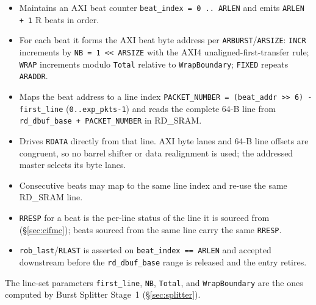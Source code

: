 \begin{itemize}[noitemsep]
  \item Maintains an AXI beat counter \texttt{beat\_index = 0 .. ARLEN} and
        emits \texttt{ARLEN + 1} R beats in order.
  \item For each beat it forms the AXI beat byte address per
        \texttt{ARBURST}/\texttt{ARSIZE}: \texttt{INCR} increments by
        \texttt{NB = 1 << ARSIZE} with the AXI4 unaligned-first-transfer
        rule; \texttt{WRAP} increments modulo \texttt{Total} relative to
        \texttt{WrapBoundary}; \texttt{FIXED} repeats \texttt{ARADDR}.
  \item Maps the beat address to a line index
        \texttt{PACKET\_NUMBER = (beat\_addr >> 6) - first\_line}
        (\texttt{0..exp\_pkts-1}) and reads the complete 64-B line from
        \texttt{rd\_dbuf\_base + PACKET\_NUMBER} in RD\_SRAM.
  \item Drives \texttt{RDATA} directly from that line.  AXI byte lanes and
        64-B line offsets are congruent, so no barrel shifter or data
        realignment is used; the addressed master selects its byte lanes.
  \item Consecutive beats may map to the same line index and re-use the same
        RD\_SRAM line.
  \item \texttt{RRESP} for a beat is the per-line status of the line it is
        sourced from (\S\ref{sec:cifmc}); beats sourced from the same line
        carry the same \texttt{RRESP}.
  \item \texttt{rob\_last}/\texttt{RLAST} is asserted on
        \texttt{beat\_index == ARLEN} and accepted downstream before the
        \texttt{rd\_dbuf\_base} range is released and the entry retires.
\end{itemize}

The line-set parameters \texttt{first\_line}, \texttt{NB}, \texttt{Total},
and \texttt{WrapBoundary} are the ones computed by Burst Splitter Stage~1
(\S\ref{sec:splitter}).
